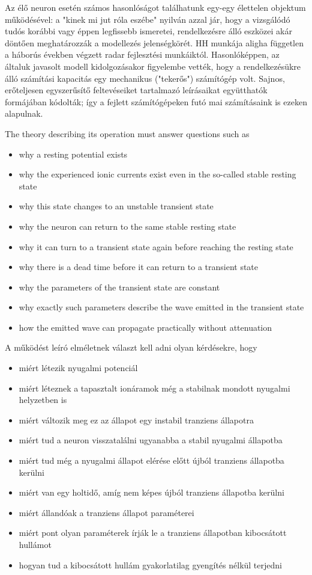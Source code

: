 Az élő neuron esetén számos hasonlóságot találhatunk egy-egy élettelen objektum működésével: a "kinek mi jut róla eszébe" nyilván azzal jár, hogy a vizsgálódó tudós korábbi vagy éppen legfissebb  ismeretei, rendelkezésre álló eszközei akár döntően meghatározzák a modellezés jelenségkörét. \gls{HH} munkája aligha független a háborús években végzett radar fejlesztési munkáiktól.
Hasonlóképpen, az általuk javasolt modell kidolgozásakor
figyelembe vették, hogy a rendelkezésükre álló számítási kapacitás egy mechanikus ("tekerős") számítógép volt. Sajnos, erőteljesen egyszerűsítő feltevéseiket tartalmazó leírásaikat együtthatók formájában kódolták; így a fejlett számítógépeken futó mai számításaink is ezeken alapulnak. 

\fi

\ifx\magyar\undefined
The theory describing its operation must answer questions such as
\begin{itemize} 
\setlength\itemsep{0em}

\item why a resting potential exists
\item why the experienced ionic currents exist even in the so-called stable resting state
\item why this state changes to an unstable transient state
\item why the neuron can return to the same stable resting state
\item why it can turn to a transient state again before reaching the resting state
\item why there is a dead time before it can return to a transient state
\item why the parameters of the transient state are constant
\item why exactly such parameters describe the wave emitted in the transient state
\item how the emitted wave can propagate practically without attenuation
\end{itemize}

\else

A működést leíró elméletnek választ kell adni olyan kérdésekre, hogy
\begin{itemize}
\item miért létezik nyugalmi potenciál
\item miért léteznek a tapasztalt
ionáramok még a stabilnak mondott nyugalmi helyzetben is
\item miért változik meg ez az állapot egy instabil tranziens
állapotra
\item miért tud a neuron visszatalálni ugyanabba a
stabil nyugalmi állapotba
\item miért tud még a nyugalmi állapot elérése előtt
újból tranziens állapotba kerülni
\item miért van egy holtidő, amíg nem képes újból   tranziens állapotba kerülni
\item miért állandóak a tranziens állapot paraméterei
\item miért pont olyan paraméterek írják le a tranziens állapotban kibocsátott hullámot
\item hogyan tud a kibocsátott hullám gyakorlatilag gyengítés nélkül terjedni
\end{itemize}
\fi

